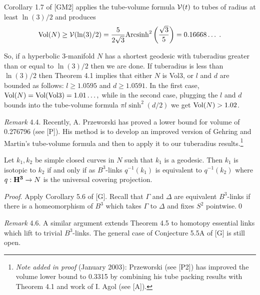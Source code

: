  Corollary 1.7 of [GM2] applies the tube-volume formula ${\cal V}(t)$ to tubes of radius at least
$\ln(3)/2$ and produces 
$${\rm Vol}(N) \ge {\cal V}(\ln(3)/2) = {5 \over 2 \sqrt 3} {\rm Arcsinh}^2\left({ \sqrt 3 \over 5}\right) =
0.16668\ldots\; .$$

So, if a hyperbolic $3$-manifold $N$ has a shortest geodesic with tuberadius
greater than or equal to $\ln(3)/2$ then we are done.  
If tuberadius is less than $\ln(3)/2$ then Theorem 4.1 implies that
either $N$ is Vol3, 
or $l$ and $d$ are bounded as follows: $l \ge 
1.0595$  and $d \ge 1.0591.$
 In the first case, 
  ${\rm Vol}(N)  = {\rm Vol}({\rm Vol3}) = 1.01\ldots,$
while in the second case, plugging the $l$ and $d$ bounds into the tube-volume formula $\pi l \sinh^2(d/2)$
 we get ${\rm Vol}(N) > 1.02$.
\enddemo

{\it Remark} 4.4. Recently, A. Przeworski has proved a lower bound for volume of 0.276796 (see [P]).  His method is
to develop an improved version of Gehring and Martin's tube-volume formula and then to apply it to our tuberadius
results.\footnote{{\it Note added in proof} (January 2003): Przeworski (see [P2]) has improved the volume
lower bound to 0.3315 by combining his tube packing results with Theorem 4.1 and work of I. Agol (see [A]).} 

  Let $k_1, k_2$  be simple closed curves in $N$ such that $k_1$ is
a geodesic.  Then $k_1$ is isotopic to $k_2$ if and only if as $B^3$\/{\rm -}\/links
$q^{-1}(k_1)$ is equivalent to $q^{-1}(k_2)$ where $q : {\bf H^3} \to N$ is the universal covering
projection.
\endproclaim

{\it Proof}.  Apply Corollary 5.6 of [G]. 
Recall that $\Gamma$ and $\Delta$ are equivalent 
$B^3$-links  if there is a homeomorphism of $B^3$ which takes $\Gamma$ to
$\Delta$ and fixes $S^2$ pointwise.\hfill\qed{}

{\it Remark} 4.6.  A similar argument extends Theorem 4.5 to homotopy essential
links which lift to trivial $B^3$-links.  The general case of Conjecture 5.5A of [G] is still open.

 

 


